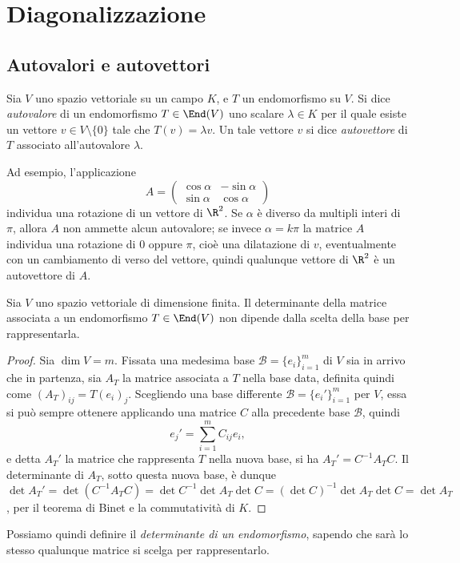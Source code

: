 \chapter{Diagonalizzazione}
\section{Autovalori e autovettori}
\begin{definizione}\label{d:autovalore}
	Sia $V$ uno spazio vettoriale su un campo $K$, e $T$ un endomorfismo su $V$.
	Si dice \emph{autovalore} di un endomorfismo $T\in\End(V)$ uno scalare $\lambda\in K$ per il quale esiste un vettore $v\in V\setminus\{0\}$ tale che $T(v)=\lambda v$.
	Un tale vettore $v$ si dice \emph{autovettore} di $T$ associato all'autovalore $\lambda$.
\end{definizione}
Ad esempio, l'applicazione
\begin{equation*}
	A=\begin{pmatrix}\cos\alpha&-\sin\alpha\\\sin\alpha&\cos\alpha\end{pmatrix}
\end{equation*}
individua una rotazione di un vettore di $\R^2$.
Se $\alpha$ è diverso da multipli interi di $\pi$, allora $A$ non ammette alcun autovalore; se invece $\alpha=k\pi$ la matrice $A$ individua una rotazione di 0 oppure $\pi$, cioè una dilatazione di $v$, eventualmente con un cambiamento di verso del vettore, quindi qualunque vettore di $\R^2$ è un autovettore di $A$.

\begin{teorema} \label{t:determinante-invarianza-base}
	Sia $V$ uno spazio vettoriale di dimensione finita.
	Il determinante della matrice associata a un endomorfismo $T\in\End(V)$ non dipende dalla scelta della base per rappresentarla.	
\end{teorema}
\begin{proof}
	Sia $\dim V=m$.
	Fissata una medesima base $\mathcal B=\{e_i\}_{i=1}^m$ di $V$ sia in arrivo che in partenza, sia $A_T$ la matrice associata a $T$ nella base data, definita quindi come $(A_T)_{ij}=T(e_i)_j$.
	Scegliendo una base differente $\mathcal B=\{e_i'\}_{i=1}^m$ per $V$, essa si può sempre ottenere applicando una matrice $C$ alla precedente base $\mathcal B$, quindi
	\begin{equation*}
		e_j'=\sum_{i=1}^mC_{ij}e_i,
	\end{equation*}
	e detta $A_T'$ la matrice che rappresenta $T$ nella nuova base, si ha $A_T'=C^{-1}A_TC$.
	Il determinante di $A_T$, sotto questa nuova base, è dunque $\det A_T'=\det(C^{-1}A_TC)=\det C^{-1}\det A_T\det C=(\det C)^{-1}\det A_T\det C=\det A_T$, per il teorema di Binet e la commutatività di $K$.
\end{proof}
Possiamo quindi definire il \emph{determinante di un endomorfismo}, sapendo che sarà lo stesso qualunque matrice si scelga per rappresentarlo. 

